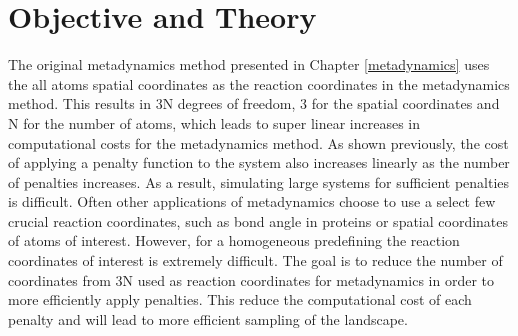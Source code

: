 \label{enhanced methods}


\section{Objective and Theory}
The original metadynamics method presented in Chapter \ref{metadynamics} uses the all atoms spatial coordinates as the reaction coordinates in the metadynamics method.  This results in 3N degrees of freedom, 3 for the spatial coordinates and N for the number of atoms, which leads to super linear increases in computational costs for the metadynamics method.  As shown previously, the cost of applying a penalty function to the system also increases linearly as the number of penalties increases.  As a result, simulating large systems for sufficient penalties is difficult.  Often other applications of metadynamics choose to use a select few crucial reaction coordinates, such as bond angle in proteins or spatial coordinates of atoms of interest.  However, for a homogeneous predefining the reaction coordinates of interest is extremely difficult.  The goal is to reduce the number of coordinates from 3N used as reaction coordinates for metadynamics in order to more efficiently apply penalties.  This reduce the computational cost of each penalty and will lead to more efficient sampling of the landscape.  

